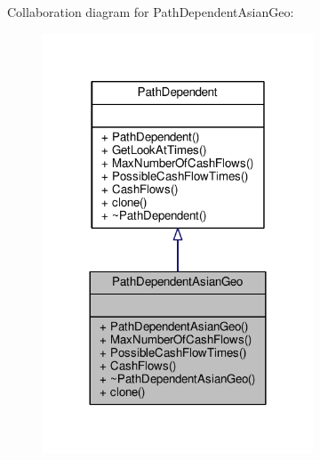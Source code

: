 Collaboration diagram for Path\+Dependent\+Asian\+Geo\+:
\nopagebreak
\begin{figure}[H]
\begin{center}
\leavevmode
\includegraphics[width=228pt]{classPathDependentAsianGeo__coll__graph}
\end{center}
\end{figure}
